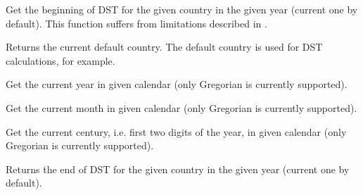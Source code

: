 Get the beginning of DST for the given country in the given year (current one
by default). This function suffers from limitations described in 
.



\label{wxdatetimegetcountry}


Returns the current default country. The default country is used for DST
calculations, for example.



\label{wxdatetimegetcurrentyear}


Get the current year in given calendar (only Gregorian is currently supported).

\label{wxdatetimegetcurrentmonth}


Get the current month in given calendar (only Gregorian is currently supported).

\label{wxdatetimegetcentury}


Get the current century, i.e. first two digits of the year, in given calendar
(only Gregorian is currently supported).

\label{wxdatetimegetenddst}


Returns the end of DST for the given country in the given year (current one by
default).



\label{wxdatetimegetmonthname}


